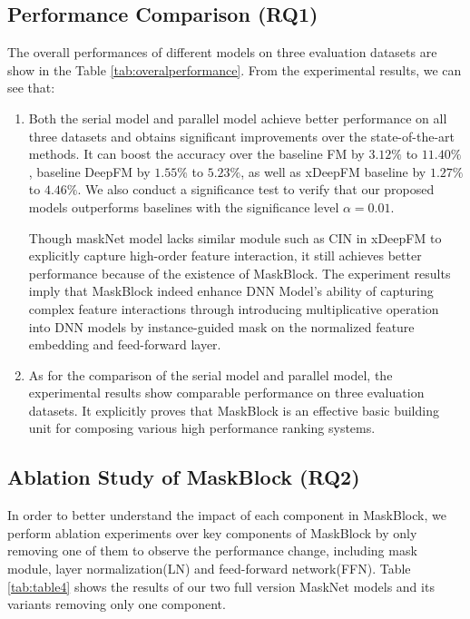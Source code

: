 \documentclass[sigconf]{acmart}
\begin{document}
\subsection{Performance Comparison (RQ1)}
The overall performances of different models on three evaluation datasets are show in the Table \ref{tab:overalperformance}. From the experimental results, we can see that:
\begin{enumerate}
  \item Both the serial model and parallel model achieve  better performance on all three datasets and obtains significant improvements over the state-of-the-art methods. It can boost the accuracy over the baseline FM by $3.12\%$ to $11.40\%$, baseline DeepFM by $1.55\%$ to $5.23\%$, as well as  xDeepFM baseline by $1.27\%$ to $4.46\%$. We also conduct a significance test to verify that our proposed models outperforms baselines with the significance level $\alpha = 0.01$.


  Though maskNet model lacks similar module such as CIN in xDeepFM to explicitly capture high-order feature interaction, it still achieves better performance because of the existence of MaskBlock. The experiment results imply that MaskBlock indeed  enhance DNN Model's ability of capturing complex feature interactions through introducing multiplicative operation into DNN models by instance-guided mask on the  normalized feature embedding and feed-forward layer.

  \item As for the comparison of the serial model and parallel model, the experimental results show comparable performance on three evaluation datasets. It explicitly proves that MaskBlock is an effective basic building unit for composing various high performance ranking systems.
\end{enumerate}



\subsection{Ablation Study of MaskBlock (RQ2)}
In order to better understand the impact of each component in MaskBlock, we perform ablation experiments over key components of  MaskBlock by only removing one of them  to observe the performance change, including mask module, layer normalization(LN) and feed-forward network(FFN). Table \ref{tab:table4} shows the results of our two full version MaskNet models and its variants removing only one component.
\end{document}
